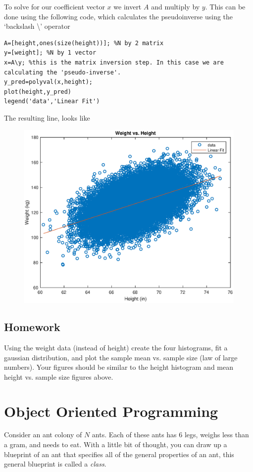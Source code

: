 \documentclass[12pt]{article}
\begin{document}
To solve for our coefficient vector $x$ we invert $A$ and multiply by $y$. This can be done using the following code, which calculates the pseudoinverse using the `backslash \textbackslash' operator

\begin{lstlisting}[frame=single]
%A*x=y or height*x=weight. To solve for x, we invert
A=[height,ones(size(height))]; %N by 2 matrix
y=[weight]; %N by 1 vector
x=A\y; %this is the matrix inversion step. In this case we are calculating the 'pseudo-inverse'.
y_pred=polyval(x,height);
plot(height,y_pred)
legend('data','Linear Fit')
\end{lstlisting}

The resulting line, looks like

\begin{figure}[H]
\centering
\includegraphics[width=0.75\linewidth]{matlab/dataHeightWeight/linearFitHeightWeight.eps}
\end{figure}

\subsection{Homework}
Using the weight data (instead of height) create the four histograms, fit a gaussian distribution, and plot the sample mean vs. sample size (law of large numbers). Your figures should be similar to the height histogram and mean height vs. sample size figures above.

\newpage

\section{Object Oriented Programming}

Consider an ant colony of $N$ ants. Each of these ants has 6 legs, weighs less than a gram, and needs to eat. With a little bit of thought, you can draw up a blueprint of an ant that specifies all of the general properties of an ant, this general blueprint is called a \textit{class}. 
\end{document}
